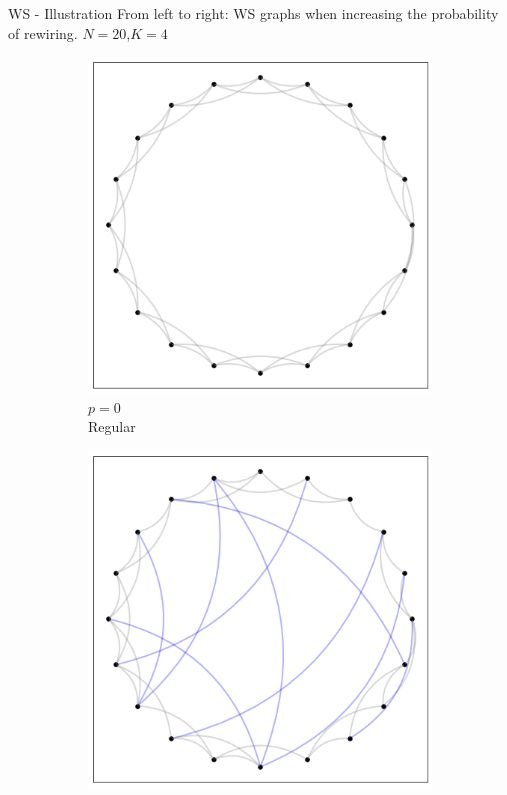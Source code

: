 \documentclass[a4paper,11pt]{book}
\begin{document}
\begin{textbox}{WS - Illustration}
From left to right: WS graphs when increasing the probability of rewiring. $N=20$,$K=4$
\centering
\begin{figure}[H]

\begin{subfigure}{.32\textwidth}
\includegraphics[width=\textwidth]{pics/SW/WS0.png}
    \caption{$p=0$ \\ Regular}
\end{subfigure}
\begin{subfigure}{.32\textwidth}
\includegraphics[width=\textwidth]{pics/SW/WS1.png}

\end{subfigure}
\end{figure}
\end{textbox}
\end{document}
